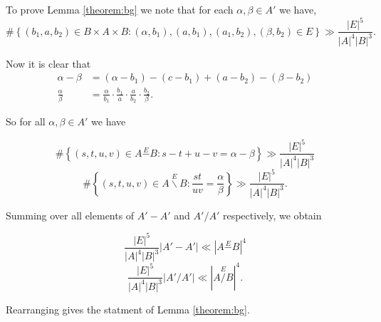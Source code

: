 \documentclass[12pt]{article}
\begin{document}
To prove Lemma \ref{theorem:bg} we note that for each $\alpha,\beta \in A'$ we have, 
$$\#\left\{(b_1,a,b_2)\in B \times A \times B:(\alpha,b_1),(a,b_1),(a_1,b_2),(\beta,b_2)\in E\right\}\gg \frac{|E|^5}{|A|^4|B|^3}.$$

Now it is clear that 
\begin{align*}
\alpha-\beta&= (\alpha-b_1)-(c-b_1)+(a-b_2)-(\beta-b_2)\\ 
\frac{\alpha}{\beta}&=\frac{\alpha}{b_1}\cdot \frac{b_1}{a} \cdot \frac{a}{b_2}\cdot \frac{b_2}{\beta}.
\end{align*}

So for all $\alpha,\beta \in A'$ we have

$$\#\left\{(s,t,u,v)\in A\stackrel{E}{-}B:s-t+u-v=\alpha-\beta\right\}\gg\frac{|E|^5}{|A|^4|B|^3}  $$ 
$$\#\left\{(s,t,u,v)\in A\stackrel{E}{\backslash}B:\frac{st}{uv}=\frac{\alpha}{\beta}\right\}\gg \frac{|E|^5}{|A|^4|B|^3}.$$

Summing over all elements of $A'-A'$ and $A'/A'$ respectively, we obtain

$$\frac{|E|^5}{|A|^4|B|^3}|A'-A'|\ll\left|A \stackrel{E}{-}B \right|^4 $$
$$\frac{|E|^5}{|A|^4|B|^3}|A'/A'|\ll\left|A \stackrel{E}{/}B\right|^4. $$

Rearranging gives the statment of Lemma \ref{theorem:bg}.



\end{document}
